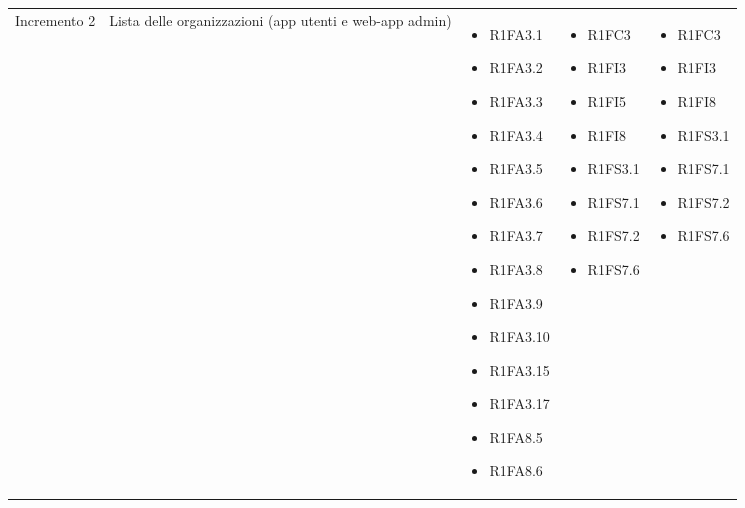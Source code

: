 {\begin{longtable}{C{2.5cm} C{3.2cm} C{2.8cm} C{2.8cm} C{2.8cm}}
Incremento 2 & Lista delle organizzazioni (app utenti e web-app admin) & \begin{itemize}
    \item[ ] R1FA3.1
    \item[ ] R1FA3.2
    \item[ ] R1FA3.3
    \item[ ] R1FA3.4
    \item[ ] R1FA3.5
    \item[ ] R1FA3.6
    \item[ ] R1FA3.7
    \item[ ] R1FA3.8
    \item[ ] R1FA3.9
    \item[ ] R1FA3.10
    \item[ ] R1FA3.15
    \item[ ] R1FA3.17
    \item[ ] R1FA8.5
    \item[ ] R1FA8.6
\end{itemize} & \begin{itemize} 
    \item[ ] R1FC3
    \item[ ] R1FI3
    \item[ ] R1FI5
    \item[ ] R1FI8
    \item[ ] R1FS3.1
    \item[ ] R1FS7.1
    \item[ ] R1FS7.2
    \item[ ] R1FS7.6
\end{itemize} & \begin{itemize} 
    \item[ ] R1FC3
    \item[ ] R1FI3
    \item[ ] R1FI8
    \item[ ] R1FS3.1
    \item[ ] R1FS7.1
    \item[ ] R1FS7.2
    \item[ ] R1FS7.6
\end{itemize}\\


\end{longtable}}

